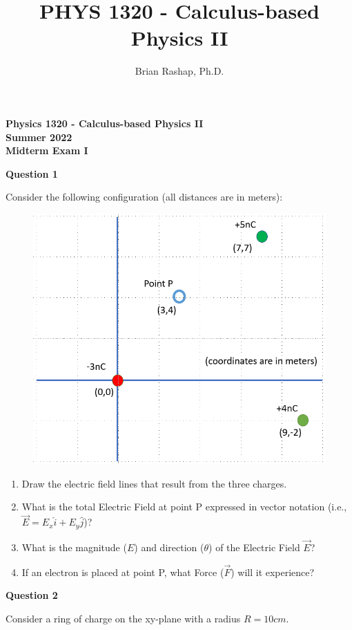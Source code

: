 \documentclass[14pt]{report}
\author{Brian Rashap, Ph.D.}
\title{PHYS 1320 - Calculus-based Physics II}
\begin{document}
\begin{center}
\textbf{Physics 1320 - Calculus-based Physics II \\ Summer 2022 \\ Midterm Exam I}
\end{center}

\textbf{Question 1}

Consider the following configuration (all distances are in meters):

\begin{figure}[H]
\begin{center}
\includegraphics[scale=0.30]{exam1_1.png}
\end{center}
\end{figure}
\begin{enumerate}[label=\Alph*]
\item Draw the electric field lines that result from the three charges.
\item What is the total Electric Field at point P expressed in vector notation (i.e., $\vec{E} = E_x \hat{i} + E_y \hat{j}$)?
\item What is the magnitude ($E$) and direction ($\theta$) of the Electric Field $\vec{E}$?
\item If an electron is placed at point P, what Force ($\vec{F}$) will it experience?
\end{enumerate}

\textbf{Question 2}

Consider a ring of charge on the xy-plane with a radius $R = 10cm$. 
\end{document}
